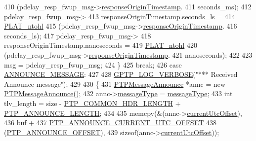 \begin{DoxyCode}
{{{{{{{{410                 (pdelay\_resp\_fwup\_msg->\hyperlink{class_p_t_p_message_path_delay_resp_follow_up_ace95ddb3f03eb3b4fcf8f73281dc0ee3}{responseOriginTimestamp}.
411                  seconds\_ms);
412             pdelay\_resp\_fwup\_msg->
413                 responseOriginTimestamp.seconds\_ls =
414                 \hyperlink{linux_2src_2platform_8cpp_ad335681c3444e0406899693a6f782173}{PLAT\_ntohl}
415                 (pdelay\_resp\_fwup\_msg->\hyperlink{class_p_t_p_message_path_delay_resp_follow_up_ace95ddb3f03eb3b4fcf8f73281dc0ee3}{responseOriginTimestamp}.
416                  seconds\_ls);
417             pdelay\_resp\_fwup\_msg->
418                 responseOriginTimestamp.nanoseconds =
419                 \hyperlink{linux_2src_2platform_8cpp_ad335681c3444e0406899693a6f782173}{PLAT\_ntohl}
420                 (pdelay\_resp\_fwup\_msg->\hyperlink{class_p_t_p_message_path_delay_resp_follow_up_ace95ddb3f03eb3b4fcf8f73281dc0ee3}{responseOriginTimestamp}.
421                  nanoseconds);
422 
423             msg = pdelay\_resp\_fwup\_msg;
424         \}
425         \textcolor{keywordflow}{break};
426     \textcolor{keywordflow}{case} \hyperlink{avbts__message_8hpp_ac6606ebe91c8ac66a2c314c79f5ab013a4c8d615c4de8a7fc2ea24b5eff2811ef}{ANNOUNCE\_MESSAGE}:
427 
428         \hyperlink{gptp__log_8hpp_add03384a2a8099b27e07d041cce77e6f}{GPTP\_LOG\_VERBOSE}(\textcolor{stringliteral}{"*** Received Announce message"});
429 
430         \{
431             \hyperlink{class_p_t_p_message_announce}{PTPMessageAnnounce} *annc = \textcolor{keyword}{new} \hyperlink{class_p_t_p_message_announce}{PTPMessageAnnounce}();
432             annc->\hyperlink{class_p_t_p_message_common_adb32627aa5b0e2dbad3ccd88aab07c05}{messageType} = \hyperlink{class_p_t_p_message_common_adb32627aa5b0e2dbad3ccd88aab07c05}{messageType};
433             \textcolor{keywordtype}{int} tlv\_length = size - \hyperlink{avbts__message_8hpp_a8ec4d965b7b1e83844f1c17f12e9b8e4}{PTP\_COMMON\_HDR\_LENGTH} + 
      \hyperlink{avbts__message_8hpp_ad800b5cd5359d021054af8e902100ba7}{PTP\_ANNOUNCE\_LENGTH};
434 
435             memcpy(&(annc->\hyperlink{class_p_t_p_message_announce_a4ee8eca04b1ccd7d8eaae5f0dd3a11fa}{currentUtcOffset}),
436                    buf +
437                    \hyperlink{avbts__message_8hpp_acd887e469bb001b97f8eef87a997ae59}{PTP\_ANNOUNCE\_CURRENT\_UTC\_OFFSET}
438                    (\hyperlink{avbts__message_8hpp_aaa3da4fa4e9e4cfe49477cd7f6b95bca}{PTP\_ANNOUNCE\_OFFSET}),
439                    \textcolor{keyword}{sizeof}(annc->\hyperlink{class_p_t_p_message_announce_a4ee8eca04b1ccd7d8eaae5f0dd3a11fa}{currentUtcOffset}));
}}}}}}}}
\end{DoxyCode}

